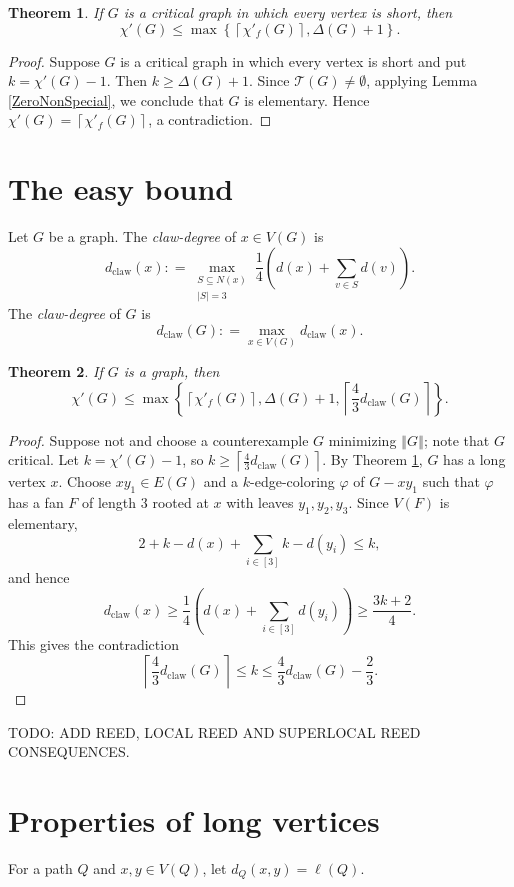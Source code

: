 \documentclass[12pt]{amsart}
\theoremstyle{plain}
\newtheorem{thm}{Theorem}
\theoremstyle{definition}
\theoremstyle{remark}
\newcommand{\fancy}[1]{\mathcal{#1}}
\newcommand{\T}{\fancy{T}}
\newcommand{\set}[1]{\left\{ #1 \right\}}
\newcommand{\card}[1]{\left|#1\right|}
\newcommand{\size}[1]{\left\Vert#1\right\Vert}
\newcommand{\ceil}[1]{\left\lceil#1\right\rceil}
\newcommand{\irange}[1]{\left[#1\right]}
\newcommand{\parens}[1]{\left( #1 \right)}
\newcommand{\DefinedAs}{\mathrel{\mathop:}=}
\newcommand{\dclaw}[1]{d_{\text{claw}}\left( #1 \right)}
\newcommand{\vph}{\varphi}
\begin{document}
\begin{thm}\label{AllSpecialImpliesElementary}
If $G$ is a critical graph in which every vertex is short, then
\[\chi'(G) \le \max \set{\ceil{\chi'_f(G)}, \Delta(G) + 1}.\]
\end{thm}
\begin{proof}
Suppose $G$ is a critical graph in which every vertex is short and put $k = \chi'(G) - 1$.  Then $k \ge \Delta(G) + 1$.
Since $\T(G) \ne \emptyset$, applying Lemma \ref{ZeroNonSpecial}, we conclude that $G$ is elementary.  Hence $\chi'(G) = \ceil{\chi'_f(G)}$, a contradiction.
\end{proof}

\section{The easy bound}
Let $G$ be a graph.  The \emph{claw-degree} of $x \in V(G)$ is 
\[\dclaw{x} \DefinedAs \max_{\substack{S \subseteq N(x) \\ \card{S} = 3}}\frac14 \parens{d(x) + \sum_{v \in S} d(v)}.\]
The \emph{claw-degree} of $G$ is 
\[\dclaw{G} \DefinedAs \max_{x \in V(G)} \dclaw{x}.\]
\begin{thm}\label{EasyBound}
If $G$ is a graph, then
\[\chi'(G) \le \max\set{\ceil{\chi'_f(G)}, \Delta(G) + 1, \ceil{\frac43\dclaw{G}}}.\]
\end{thm}
\begin{proof}
Suppose not and choose a counterexample $G$ minimizing $\size{G}$; note that $G$ critical. 
Let $k=\chi'(G)-1$, so $k \ge \ceil{\frac43\dclaw{G}}$. 
By Theorem \ref{AllSpecialImpliesElementary}, $G$ has a long vertex $x$.
Choose $xy_1 \in E(G)$ and a $k$-edge-coloring $\vph$ of $G - xy_1$ such that
$\vph$ has a fan $F$ of length $3$ rooted at $x$ with leaves $y_1, y_2, y_3$.  
Since $V(F)$ is elementary, 
\[2 + k - d(x) + \sum_{i \in \irange{3}} k-d(y_i) \le k,\]
and hence
\[\dclaw{x} \ge \frac14\parens{d(x) + \sum_{i \in \irange{3}} d(y_i)} \ge \frac{3k+2}{4}.\]
This gives the contradiction
\[\ceil{\frac43\dclaw{G}} \le k \le \frac43\dclaw{G} - \frac23.\]
\end{proof}

TODO: ADD REED, LOCAL REED AND SUPERLOCAL REED CONSEQUENCES.

\section{Properties of long vertices}
For a path $Q$ and $x,y \in V(Q)$, let $d_Q(x,y) = \ell(Q)$.
\end{document}
